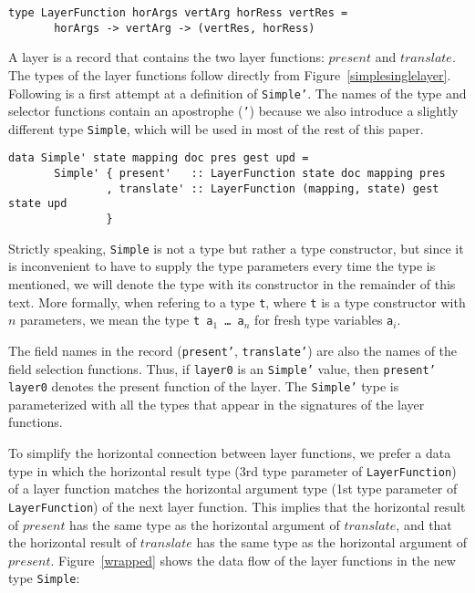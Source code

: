 \begin{small}
\begin{verbatim}
type LayerFunction horArgs vertArg horRess vertRes =
       horArgs -> vertArg -> (vertRes, horRess)
\end{verbatim}
\end{small}

A layer is a record that contains the two layer functions: $present$ and $translate$. The types of the layer functions follow directly from Figure~\ref{simplesinglelayer}. Following is a first attempt at a definition of \texttt{Simple'}. The names of the type and selector functions contain an apostrophe (\texttt{'}) because we also introduce a slightly different type \texttt{Simple}, which will be used in most of the rest of this paper. 

\begin{small}
\begin{verbatim}
data Simple' state mapping doc pres gest upd =
       Simple' { present'   :: LayerFunction state doc mapping pres
               , translate' :: LayerFunction (mapping, state) gest state upd
               }
\end{verbatim}
\end{small}

Strictly speaking, \texttt{Simple} is not a type but rather a type constructor, but since it is inconvenient to have to supply the type parameters every time the type is mentioned, we will denote the type with its constructor in the remainder of this text. More formally, when refering to a type \texttt{t}, where \texttt{t} is a type constructor with $n$ parameters, we mean the type \texttt{t a$_1$ \dots ~a$_n$} for fresh type variables \texttt{a$_i$}.

The field names in the record (\texttt{present'}, \texttt{translate'}) are also the names of the field selection functions. Thus, if \texttt{layer0} is an \texttt{Simple'} value, then \texttt{present' layer0} denotes the present function of the layer. The \texttt{Simple'} type is parameterized with all the types that appear in the signatures of the layer functions.

To simplify the horizontal connection between layer functions, we prefer a data type in which the horizontal result type (3rd type parameter of \texttt{LayerFunction}) of a layer function matches the horizontal argument type (1st type parameter of \texttt{LayerFunction}) of the next layer function. This implies that the horizontal result of $present$ has the same type as the horizontal argument of $translate$, and that the horizontal result of $translate$ has the same type as the horizontal argument of $present$. Figure~\ref{wrapped} shows the data flow of the layer functions in the new type \texttt{Simple}:

